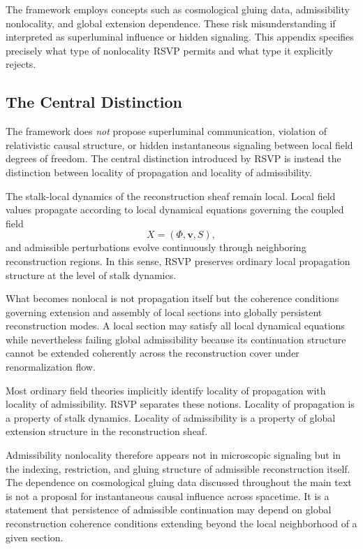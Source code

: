 \documentclass[11pt, a4paper]{article}
\theoremstyle{plain}
\theoremstyle{definition}
\theoremstyle{remark}
\begin{document}
The framework employs concepts such as cosmological gluing data, admissibility
nonlocality, and global extension dependence. These risk misunderstanding if
interpreted as superluminal influence or hidden signaling. This appendix specifies
precisely what type of nonlocality RSVP permits and what type it explicitly rejects.

\subsection{The Central Distinction}

The framework does \emph{not} propose superluminal communication, violation of
relativistic causal structure, or hidden instantaneous signaling between local field
degrees of freedom.  The central distinction introduced by RSVP is instead the
distinction between locality of propagation and locality of admissibility.

The stalk-local dynamics of the reconstruction sheaf remain local.  Local field
values propagate according to local dynamical equations governing the coupled field
\[
  X = (\Phi,\mathbf{v},S),
\]
and admissible perturbations evolve continuously through neighboring reconstruction
regions.  In this sense, RSVP preserves ordinary local propagation structure at the
level of stalk dynamics.

What becomes nonlocal is not propagation itself but the coherence conditions
governing extension and assembly of local sections into globally persistent
reconstruction modes.  A local section may satisfy all local dynamical equations
while nevertheless failing global admissibility because its continuation structure
cannot be extended coherently across the reconstruction cover under renormalization
flow.

Most ordinary field theories implicitly identify locality of propagation with
locality of admissibility.  RSVP separates these notions.  Locality of propagation
is a property of stalk dynamics.  Locality of admissibility is a property of global
extension structure in the reconstruction sheaf.

Admissibility nonlocality therefore appears not in microscopic signaling but in the
indexing, restriction, and gluing structure of admissible reconstruction itself.
The dependence on cosmological gluing data discussed throughout the main text is not
a proposal for instantaneous causal influence across spacetime.  It is a statement
that persistence of admissible continuation may depend on global reconstruction
coherence conditions extending beyond the local neighborhood of a given section.
\end{document}
